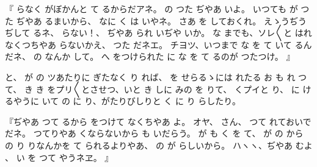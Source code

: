 『
らなく
がぼかんと
て
るからだアネ。
の
つた
ぢやあ
いよ。
いつても
が
つた
ぢやあ
るまいから、
なに
く
は
いやネ。
さあ
を
しておくれ。
えゝうぢうぢして
るネ、
らない！、
ぢやあ
られ
いぢや
いか。
な
までも、ソレ〳〵と
はれなくつちやあ
らないかえ、
つた
だネエ。
チヨツ、いつまで
な
を
て
いて
るんだネ、
の
なんか
して。
へ
をつけられた
に
な
を
て
るのが
つたつけ。
』

と、
が
の
ツあたりに
ぎたなく
り
れば、
を
せらるゝには
れたる
お
も
れ
つて、
き
き
をプリ〳〵とさせつ、いと
き
しに
みの
を
りて、
くプイと
り、
に
けるやうに
いて
の
に
り、がたりびしりと
く
に
り
らしたり。

『ぢやあ
つて
るから
をつけて
なくちやあ
よ。
オヤ、
さん、
つて
れておいでだネ。
つてりやあ
くならないから
も
いだらう。
が
も
く
を
て、
が
の
から
の
り
りなんかを
て
られるよりやあ、
の
が
らしいから。
ハヽヽ、ぢやあ
むよ
、
い
を
つて
やうネヱ。
』

